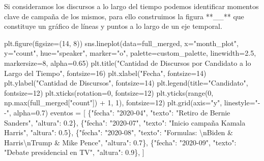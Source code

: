 \documentclass[
  letterpaper,
  DIV=11,
  numbers=noendperiod]{scrartcl}
\newenvironment{Shaded}{\begin{snugshade}}{\end{snugshade}}
\newcommand{\BuiltInTok}[1]{\textcolor[rgb]{0.00,0.23,0.31}{#1}}
\newcommand{\CharTok}[1]{\textcolor[rgb]{0.13,0.47,0.30}{#1}}
\newcommand{\DecValTok}[1]{\textcolor[rgb]{0.68,0.00,0.00}{#1}}
\newcommand{\FloatTok}[1]{\textcolor[rgb]{0.68,0.00,0.00}{#1}}
\newcommand{\NormalTok}[1]{\textcolor[rgb]{0.00,0.23,0.31}{#1}}
\newcommand{\OperatorTok}[1]{\textcolor[rgb]{0.37,0.37,0.37}{#1}}
\newcommand{\StringTok}[1]{\textcolor[rgb]{0.13,0.47,0.30}{#1}}
\begin{document}
Si consideramos los discursos a lo largo del tiempo podemos identificar
momentos clave de campaña de los mismos, para ello construimos la figura
**\_\_** que constituye un gráfico de líneas y puntos a lo largo de un
eje temporal.

\begin{Shaded}
\begin{Highlighting}[]
\NormalTok{plt.figure(figsize}\OperatorTok{=}\NormalTok{(}\DecValTok{14}\NormalTok{, }\DecValTok{8}\NormalTok{))}
\NormalTok{sns.lineplot(data}\OperatorTok{=}\NormalTok{full\_merged, x}\OperatorTok{=}\StringTok{"month\_plot"}\NormalTok{, y}\OperatorTok{=}\StringTok{"count"}\NormalTok{, hue}\OperatorTok{=}\StringTok{"speaker"}\NormalTok{, marker}\OperatorTok{=}\StringTok{"o"}\NormalTok{, palette}\OperatorTok{=}\NormalTok{custom\_palette, linewidth}\OperatorTok{=}\FloatTok{2.5}\NormalTok{, markersize}\OperatorTok{=}\DecValTok{8}\NormalTok{, alpha}\OperatorTok{=}\FloatTok{0.65}\NormalTok{)}
\NormalTok{plt.title(}\StringTok{"Cantidad de Discursos por Candidato a lo Largo del Tiempo"}\NormalTok{, fontsize}\OperatorTok{=}\DecValTok{16}\NormalTok{)}
\NormalTok{plt.xlabel(}\StringTok{"Fecha"}\NormalTok{, fontsize}\OperatorTok{=}\DecValTok{14}\NormalTok{)}
\NormalTok{plt.ylabel(}\StringTok{"Cantidad de Discursos"}\NormalTok{, fontsize}\OperatorTok{=}\DecValTok{14}\NormalTok{)}
\NormalTok{plt.legend(title}\OperatorTok{=}\StringTok{"Candidato"}\NormalTok{, fontsize}\OperatorTok{=}\DecValTok{12}\NormalTok{)}
\NormalTok{plt.xticks(rotation}\OperatorTok{=}\DecValTok{0}\NormalTok{, fontsize}\OperatorTok{=}\DecValTok{12}\NormalTok{)}
\NormalTok{plt.yticks(}\BuiltInTok{range}\NormalTok{(}\DecValTok{0}\NormalTok{, np.}\BuiltInTok{max}\NormalTok{(full\_merged[}\StringTok{"count"}\NormalTok{]) }\OperatorTok{+} \DecValTok{1}\NormalTok{, }\DecValTok{1}\NormalTok{), fontsize}\OperatorTok{=}\DecValTok{12}\NormalTok{)}
\NormalTok{plt.grid(axis}\OperatorTok{=}\StringTok{"y"}\NormalTok{, linestyle}\OperatorTok{=}\StringTok{"{-}{-}"}\NormalTok{, alpha}\OperatorTok{=}\FloatTok{0.7}\NormalTok{)}
\NormalTok{eventos }\OperatorTok{=}\NormalTok{ [}
\NormalTok{    \{}\StringTok{"fecha"}\NormalTok{: }\StringTok{"2020{-}04"}\NormalTok{, }\StringTok{"texto"}\NormalTok{: }\StringTok{"Retiro de Bernie Sanders"}\NormalTok{, }\StringTok{"altura"}\NormalTok{: }\FloatTok{0.2}\NormalTok{\},}
\NormalTok{    \{}\StringTok{"fecha"}\NormalTok{: }\StringTok{"2020{-}07"}\NormalTok{, }\StringTok{"texto"}\NormalTok{: }\StringTok{"Inicio campaña Kamala Harris"}\NormalTok{, }\StringTok{"altura"}\NormalTok{: }\FloatTok{0.5}\NormalTok{\},}
\NormalTok{    \{}\StringTok{"fecha"}\NormalTok{: }\StringTok{"2020{-}08"}\NormalTok{, }\StringTok{"texto"}\NormalTok{: }\StringTok{"Formulas: }\CharTok{\textbackslash{}n}\StringTok{Biden \& Harris}\CharTok{\textbackslash{}n}\StringTok{Trump \& Mike Pence"}\NormalTok{, }\StringTok{"altura"}\NormalTok{: }\FloatTok{0.7}\NormalTok{\},}
\NormalTok{    \{}\StringTok{"fecha"}\NormalTok{: }\StringTok{"2020{-}09"}\NormalTok{, }\StringTok{"texto"}\NormalTok{: }\StringTok{"Debate presidencial en TV"}\NormalTok{, }\StringTok{"altura"}\NormalTok{: }\FloatTok{0.9}\NormalTok{\},}
\NormalTok{]}


\end{Highlighting}
\end{Shaded}
\end{document}
